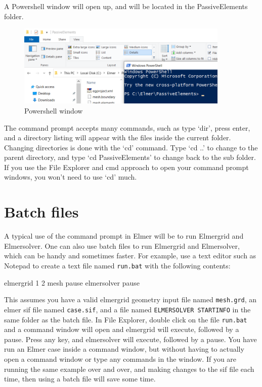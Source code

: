A Powershell window will open up, and will be located in the PassiveElements folder.\\

\begin{figure}[H]
\centering
\includegraphics[width=0.9\textwidth]{cmd-6}
\caption{Powershell window}\label{fg:cmd-6}
\end{figure}


The command prompt accepts many commands, such as type `dir', press enter, and a directory listing will appear with the files inside the current folder.  Changing directories is done with the `cd' command.   Type `cd ..' to change to the parent directory, and type `cd PassiveElements' to change back to the sub folder.  If you use the File Explorer and cmd approach to open your command prompt windows, you won't need to use `cd' much.

\section{Batch files}

A typical use of the command prompt in Elmer will be to run Elmergrid and Elmersolver.  One can also use batch files to run Elmergrid and Elmersolver, which can be handy and sometimes faster.  For example, use a text editor such as Notepad to create a text file named \texttt{run.bat} with the following contents:

\ttbegin
elmergrid 1 2 mesh
pause
elmersolver
pause
\ttend

This assumes you have a valid elmergrid geometry input file named \texttt{mesh.grd}, an elmer sif file named \texttt{case.sif}, and a file named \texttt{ELMERSOLVER STARTINFO} in the same folder as the batch file.  In File Explorer, double click on the file \texttt{run.bat} and a command window will open and elmergrid will execute, followed by a pause.  Press any key, and elmersolver will execute, followed by a pause.  You have run an Elmer case inside a command window, but without having to actually open a command window or type any commands in the window.  If you are running the same example over and over, and making changes to the sif file each time, then using a batch file will save some time.

